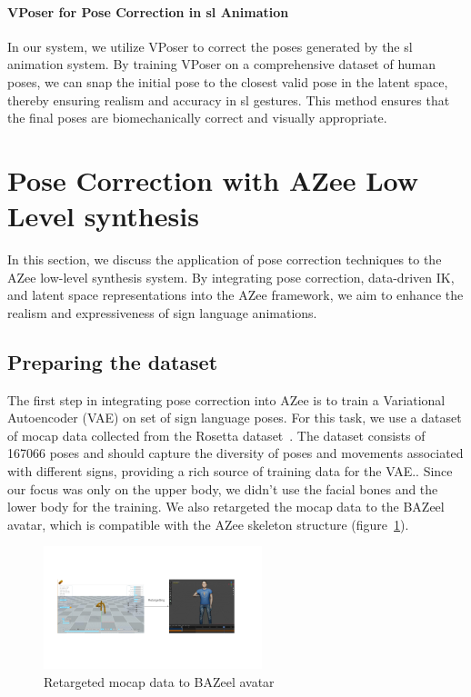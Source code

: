 \documentclass[../../main.tex]{subfiles}
\begin{document}
\paragraph{VPoser for Pose Correction in \gls{sl} Animation} In our system, we utilize VPoser to correct the poses generated by the \gls{sl} animation system. By training VPoser on a comprehensive dataset of human poses, we can snap the initial pose to the closest valid pose in the latent space, thereby ensuring realism and accuracy in \gls{sl} gestures. This method ensures that the final poses are biomechanically correct and visually appropriate.

\section{Pose Correction with AZee Low Level synthesis}
\label{ch:pose_correction:pose_correction_with_azee}

In this section, we discuss the application of pose correction techniques to the AZee low-level synthesis system. By integrating pose correction, data-driven IK, and latent space representations into the AZee framework, we aim to enhance the realism and expressiveness of sign language animations.

\subsection{Preparing the dataset}
\label{ch:pose_correction:pose_correction_with_azee:dataset}

The first step in integrating pose correction into AZee is to train a Variational Autoencoder (VAE) on set of sign language poses. For this task, we use a dataset of mocap data collected from the Rosetta dataset~\cite{bertin2022rosetta}. The dataset consists of 167066 poses and should capture the diversity of poses and movements associated with different signs, providing a rich source of training data for the VAE.. Since our focus was only on the upper body, we didn't use the facial bones and the lower body for the training. We also retargeted the mocap data to the BAZeel avatar, which is compatible with the AZee skeleton structure (figure~\ref{fig:retargeted}).

\begin{figure}
  \centering \includegraphics[width = 2.5in]{chapters/pose_correction/images/retargeted.png}
  \caption{Retargeted mocap data to BAZeel avatar}
  \label{fig:retargeted}
\end{figure}
\end{document}
